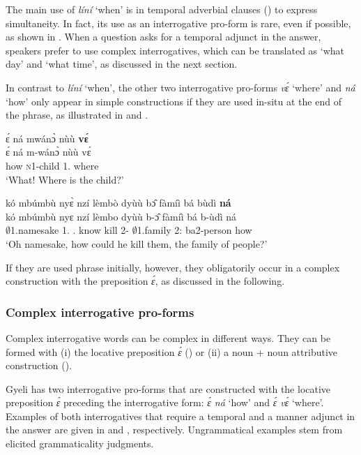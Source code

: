  The main use of {\itshape líní} `when' is in temporal adverbial clauses () to express simultaneity. In fact, its use as an interrogative pro-form is rare, even if possible, as shown in . When a question asks for a temporal adjunct in the answer, speakers prefer to use complex interrogatives, which can be translated as `what day' and `what time', as discussed in the next section.

In contrast to {\itshape líní} `when', the other two interrogative pro-forms {\itshape vɛ́} `where' and {\itshape ná} `how' only appear in simple constructions if they are used in-situ at the end of the phrase, as illustrated in  and .

\ea \label{wherevE}
  \glll ɛ́ ná mwánɔ̀ nùù {\bfseries vɛ́} \\
       ɛ́ ná m-wánɔ̀ nùù vɛ́ \\
       {\LOC} how \textsc{n}1-child 1.{\COP} where  \\
    \trans `What! Where is the child?'
\z


\ea \label{howna}
  \glll kó mbúmbù nyɛ̀ nzí lèmbò dyùù bɔ̂ fàmíì bá bùdì {\bfseries ná} \\
       kó mbúmbù nyɛ nzí lèmbo dyùù b-ɔ̂ fàmíì bá b-ùdì ná \\
       {\EXCL} $\emptyset$1.namesake 1.{\SBJ} {\PROG}.{\PST} know kill 2-{\OBJ} $\emptyset$1.family 2:{\ATT} ba2-person how \\
    \trans `Oh namesake, how could he kill them, the family of people?'
\z

\noindent If they are used phrase initially, however, they obligatorily occur in a complex construction with the preposition {\itshape ɛ́}, as discussed in the following.


\subsubsection{Complex interrogative pro-forms}
\label{sec:INTERRC}

Complex interrogative words can be complex in different ways. They can be formed with (i) the locative preposition {\itshape ɛ́} () or  (ii) a noun + noun attributive construction (). 


Gyeli has two interrogative pro-forms that are constructed with the locative preposition {\itshape ɛ́} preceding the interrogative form: {\itshape ɛ́ ná} `how'  and {\itshape ɛ́ vɛ́} `where'. Examples of both  interrogatives that require a temporal and a manner adjunct in the answer are given in  and , respectively. Ungrammatical examples stem from elicited grammaticality judgments.

